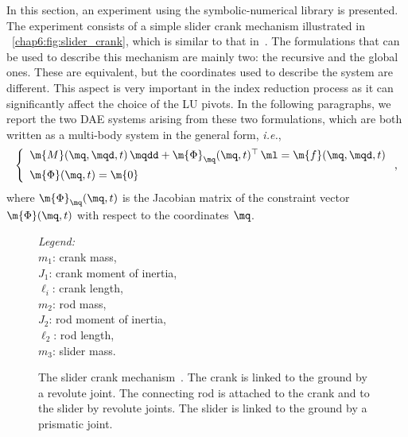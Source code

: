 In this section, an experiment using the symbolic-numerical \Indigo{} library is presented. The experiment consists of a simple slider crank mechanism illustrated in \figurename~\ref{chap6:fig:slider_crank}, which is similar to that in~\cite{zhou2007symbolic}. The formulations that can be used to describe this mechanism are mainly two: the recursive and the global ones. These are equivalent, but the coordinates used to describe the system are different. This aspect is very important in the index reduction process as it can significantly affect the choice of the LU pivots. In the following paragraphs, we report the two \ac{DAE} systems arising from these two formulations, which are both written as a multi-body system in the general form, \emph{i.e.},
%
\begin{equation}
    \label{chap6:eq:multi_body_system}
    \left\{\begin{array}{l}
        \m{M}(\mq, \mqd, t) \, \mqdd + \m{\Phi}_{\mq}(\mq, t)^\top \, \ml = \m{f}(\mq, \mqd, t) \\[2mm]
        \m{\Phi}(\mq, t) = \m{0}
    \end{array}\right. \text{,}
\end{equation}
%
where $\m{\Phi}_{\mq}(\mq, t)$ is the Jacobian matrix of the constraint vector $\m{\Phi}(\mq, t)$ with respect to the coordinates $\mq$.

\begin{figure}[htp!]
    \centering
    \begin{minipage}{0.5\textwidth}
    \end{minipage}
    \hspace{2pt}
    \begin{minipage}{0.35\textwidth}
        \small\emph{Legend:}\\
        $m_1$: crank mass, \\
        $J_1$: crank moment of inertia, \\
        $\ell_i$: crank length, \\
        $m_2$: rod mass, \\
        $J_2$: rod moment of inertia, \\
        $\ell_2$: rod length, \\
        $m_3$: slider mass. \\
    \end{minipage}
    \caption{The slider crank mechanism~\cite{zhou2007symbolic}. The crank is linked to the ground by a revolute joint. The connecting rod is attached to the crank and to the slider by revolute joints. The slider is linked to the ground by a prismatic joint.}
    \label{chap6:chap6:fig:slider_crank}
\end{figure}

